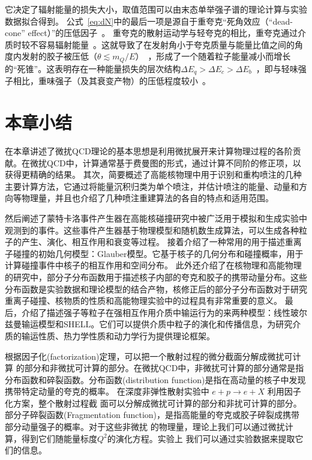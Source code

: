   它决定了辐射能量的损失大小，取值范围可以由末态单举强子谱的理论计算与实验数据拟合得到。
	公式~\ref{eq:dN}中的最后一项是源自于重夸克“死角效应（“dead-cone” effect）”的压低因子~\parencite{ALICE:2019nuy}。
		重夸克的散射运动学与轻夸克的相比，重夸克通过介质时较不容易辐射能量~\parencite{Mustafa:1997pm}。这就导致了在发射角小于夸克质量与能量比值之间的角度内发射的胶子被压低（$\theta \lesssim m_Q/E$）~\parencite{Dokshitzer:2001zm,Armesto:2003jh}，形成了一个随着粒子能量减小而增长的“死锥”。这表明存在一种能量损失的层次结构$\Delta E_q>\Delta E_c>\Delta E_b$~\parencite{Xing:2019xae,Xing:2023ciw}，即与轻味强子相比，重味强子（及其衰变产物）的压低程度较小~\parencite{Buzzatti:2011vt,Kang:2014xsa}。
	
	
	
\section{本章小结}

	在本章讲述了微扰QCD理论的基本思想是利用微扰展开来计算物理过程的各阶贡献。在微扰QCD中，计算通常基于费曼图的形式，通过计算不同阶的修正项，以获得更精确的结果。
	其次，简要概述了高能核物理中用于识别和重构喷注的几种主要计算方法，它通过将能量沉积归类为单个喷注，并估计喷注的能量、动量和方向等物理量，并且也介绍了几种喷注重建算法的各自的特点和适用范围。
	
	然后阐述了蒙特卡洛事件产生器在高能核碰撞研究中被广泛用于模拟和生成实验中观测到的事件。这些事件产生器基于物理模型和随机数生成算法，可以生成各种粒子的产生、演化、相互作用和衰变等过程。
	接着介绍了一种常用的用于描述重离子碰撞的初始几何模型：Glauber模型。它基于核子的几何分布和碰撞概率，用于计算碰撞事件中核子的相互作用和空间分布。
	此外还介绍了在核物理和高能物理的研究中，部分子分布函数用于描述核子内部的夸克和胶子的携带动量分布。这些分布函数是实验数据和理论模型的结合产物，核修正后的部分子分布函数对于研究重离子碰撞、核物质的性质和高能物理实验中的过程具有非常重要的意义。
	最后，介绍了描述强子等粒子在强相互作用介质中输运行为的来两种模型：线性玻尔兹曼输运模型和SHELL。它们可以提供介质中粒子的演化和传播信息，为研究介质的输运性质、热力学性质和动力学行为提供理论框架。







\iffalse

  根据因子化(factorization)定理，可以把一个散射过程的微分截面分解成微扰可计算 的部分和非微扰可计算的部分。在微扰QCD中，非微扰可计算的部分通常是指分布函数和碎裂函数。分布函数(distribution function)是指在高动量的核子中发现携带特定动量的夸克的概率。	
  在深度非弹性散射实验中 $e+p \rightarrow e+X$ 利用因子化方案，整个散射过程截 面可以分解成微扰可计算的部分和非扰可计算的部分。
  部分子碎裂函数(Fragmentation function)，是指高能量的夸克或胶子碎裂成携带部分动量强子的概率。对于这些非微扰 的物理量，理论上我们可以通过微扰计算，得到它们随能量标度$Q^2$的演化方程。实验上 我们可以通过实验数据来提取它们的信息。

